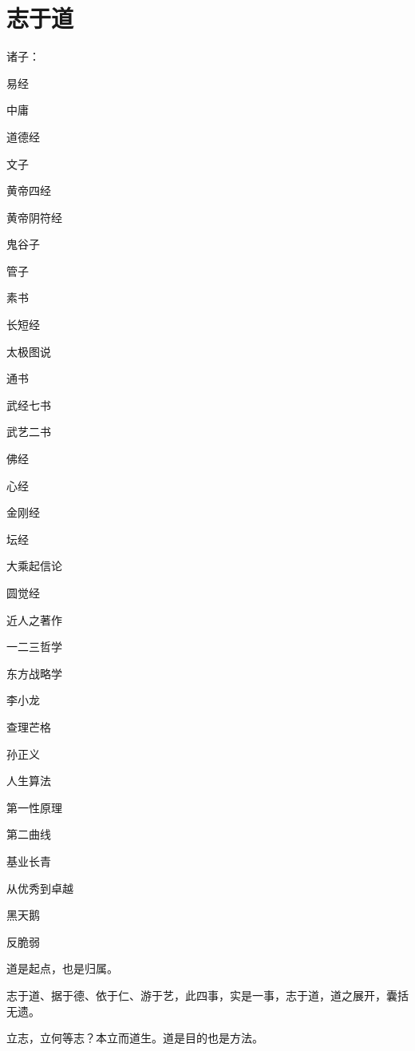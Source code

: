 \chapter{志于道}

诸子：
\begin{enumbox}
\item 易经
\item 中庸
\item 道德经
\item 文子
\item 黄帝四经
\item 黄帝阴符经
\item 鬼谷子
\item 管子
\item 素书
\item 长短经
\item 太极图说
\item 通书
\item 武经七书
\item 武艺二书
\end{enumbox}

佛经
\begin{enumbox}
\item 心经
\item 金刚经
\item 坛经
\item 大乘起信论
\item 圆觉经
\end{enumbox}

近人之著作
\begin{enumbox}
\item 一二三哲学
\item 东方战略学
\item 李小龙
\item 查理芒格
\item 孙正义
\item 人生算法
\item 第一性原理
\item 第二曲线
\item 基业长青
\item 从优秀到卓越
\item 黑天鹅
\item 反脆弱
\end{enumbox}

道是起点，也是归属。

志于道、据于德、依于仁、游于艺，此四事，实是一事，志于道，道之展开，囊括无遗。

立志，立何等志？本立而道生。道是目的也是方法。

